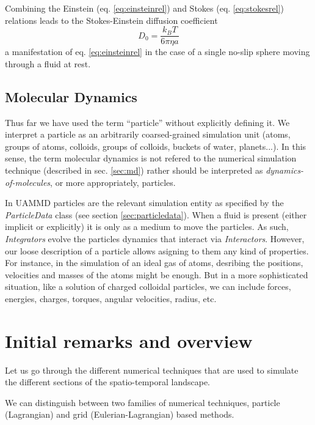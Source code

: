 \documentclass[ twoside,openright,titlepage,numbers=noenddot,%
headinclude,footinclude,cleardoublepage=empty,abstract=on,
BCOR=5mm,paper=a4,fontsize=11pt, dvipsnames
]{scrreprt}
\newcommand{\uammd}{\gls{UAMMD}\xspace}
\newcommand{\kT}{k_B T}
\begin{document}
Combining the Einstein (eq. \eqref{eq:einsteinrel}) and Stokes (eq. \eqref{eq:stokesrel}) relations leads to the Stokes-Einstein diffusion coefficient
\begin{equation}
  \label{eq:spherediff}
  D_0 = \frac{\kT}{6\pi\eta a}
\end{equation}
a manifestation of eq. \eqref{eq:einsteinrel} in the case of a single no-slip sphere moving through a fluid at rest.


\section{\uppercase{{\bfseries M}}olecular \uppercase{\textbf{D}}ynamics}\label{sec:dynmol}
Thus far we have used the term ``particle'' without explicitly defining it. We interpret a particle as an arbitrarily coarsed-grained simulation unit (atoms, groups of atoms, colloids, groups of colloids, buckets of water, planets...). In this sense, the term molecular dynamics is not refered to the numerical simulation technique (described in sec. \ref{sec:md}) rather should be interpreted as \emph{dynamics-of-molecules}, or more appropriately, particles.

In \uammd particles are the relevant simulation entity as specified by the \emph{ParticleData} class (see section \ref{sec:particledata}). When a fluid is present (either implicit or explicitly) it is only as a medium to move the particles. As such, \emph{Integrators} evolve the particles dynamics that interact via \emph{Interactors}. However, our loose description of a particle allows asigning to them any kind of properties. For instance, in the simulation of an ideal gas of atoms, desribing the positions, velocities and masses of the atoms might be enough. But in a more sophisticated situation, like a solution of charged colloidal particles, we can include forces, energies, charges, torques, angular velocities, radius, etc.




\chapter{Initial remarks and overview}

Let us go through the different numerical techniques that are used to simulate the different sections of the spatio-temporal landscape.


We can distinguish between two families of numerical techniques, particle (Lagrangian) and grid (Eulerian-Lagrangian) based methods.
\end{document}
